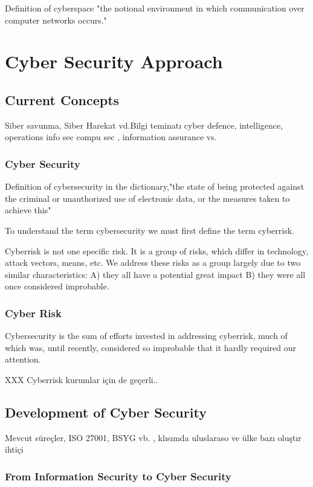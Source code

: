 \documentclass[journal]{IEEEtran}
\begin{document}
Definition of cyberspace "the notional environment in which communication over computer networks occurs." \cite{OxfordDictionary:2013}

\section{Cyber Security Approach}

\subsection{Current Concepts}
Siber savunma, Siber Harekat vd.Bilgi teminatı    cyber defence, intelligence, operations
info sec compu sec , information assurance vs.
\subsubsection{Cyber Security}

Definition of cybersecurity in the dictionary,"the state of being protected against the criminal or unauthorized use of electronic data, or the measures taken to achieve this"\cite{OxfordDictionary:2013}

To understand the term cybersecurity we must first define the term cyberrisk.

Cyberrisk is not one specific risk. It is a group of risks, which differ in technology, attack vectors, means, etc. We address these risks as a group largely due to two similar characteristics: A) they all have a potential great impact B) they were all once considered improbable.\cite{Barzilay:2013:ISACAOnline}
\subsubsection{Cyber Risk}

Cybersecurity is the sum of efforts invested in addressing cyberrisk, much of which was, until recently, considered so improbable that it hardly required our attention.

XXX Cyberrisk kurumlar için de geçerli..  

\subsection{Development of Cyber Security}

Mevcut süreçler, ISO 27001, BSYG vb.
,  klısımda uluslaraso  ve ülke bazı oluştır
ihtiçi


\subsubsection{From Information Security to Cyber Security}
\end{document}
